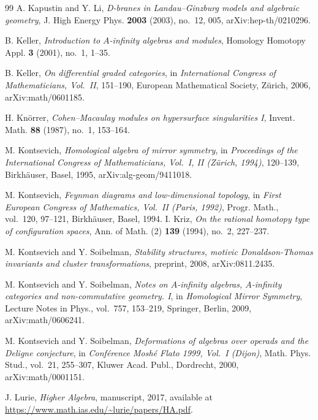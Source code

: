 \begin{thebibliography}{99}
A. Kapustin and Y. Li, \emph{D-branes in Landau--Ginzburg models and algebraic geometry}, J. High Energy Phys. \textbf{2003} (2003), no.~12, 005, arXiv:hep-th/0210296.

B. Keller, \emph{Introduction to $A$-infinity algebras and modules}, Homology Homotopy Appl. \textbf{3} (2001), no.~1, 1--35.

B. Keller, \emph{On differential graded categories}, in \emph{International Congress of Mathematicians, Vol.~II}, 151--190, European Mathematical Society, Z\"urich, 2006, arXiv:math/0601185.

H. Kn\"orrer, \emph{Cohen--Macaulay modules on hypersurface singularities I}, Invent. Math. \textbf{88} (1987), no.~1, 153--164.

M. Kontsevich, \emph{Homological algebra of mirror symmetry}, in \emph{Proceedings of the International Congress of Mathematicians, Vol.~I, II (Z\"urich, 1994)}, 120--139, Birkh\"auser, Basel, 1995, arXiv:alg-geom/9411018.

M. Kontsevich, \emph{Feynman diagrams and low-dimensional topology}, in \emph{First European Congress of Mathematics, Vol.~II (Paris, 1992)}, Progr. Math., vol.~120, 97--121, Birkh\"auser, Basel, 1994.
I. Kriz, \emph{On the rational homotopy type of configuration spaces}, Ann. of Math. (2) \textbf{139} (1994), no.~2, 227--237.

M. Kontsevich and Y. Soibelman, \emph{Stability structures, motivic Donaldson-Thomas invariants and cluster transformations}, preprint, 2008, arXiv:0811.2435.

M. Kontsevich and Y. Soibelman, \emph{Notes on $A$-infinity algebras, $A$-infinity categories and non-commutative geometry. I}, in \emph{Homological Mirror Symmetry}, Lecture Notes in Phys., vol.~757, 153--219, Springer, Berlin, 2009, arXiv:math/0606241.

M. Kontsevich and Y. Soibelman, \emph{Deformations of algebras over operads and the Deligne conjecture}, in \emph{Conf\'erence Mosh\'e Flato 1999, Vol.~I (Dijon)}, Math. Phys. Stud., vol.~21, 255--307, Kluwer Acad. Publ., Dordrecht, 2000, arXiv:math/0001151.

J. Lurie, \emph{Higher Algebra}, manuscript, 2017, available at \url{https://www.math.ias.edu/~lurie/papers/HA.pdf}.


\end{thebibliography}
